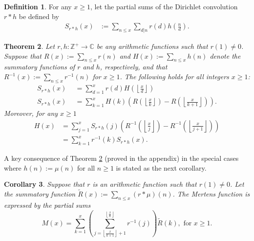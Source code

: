 \documentclass[11pt,reqno,a4letter]{article}
\newcommand{\hlocalref}[1]{\hyperref[#1]{\ref{#1}}}
\numberwithin{equation}{section}
\numberwithin{figure}{section}
\numberwithin{table}{section}
\newcommand{\floor}[1]{\left\lfloor #1 \right\rfloor}
\newcommand{\Floor}[2]{\ensuremath{\left\lfloor \frac{#1}{#2} \right\rfloor}}
\theoremstyle{plain}
\newtheorem{theorem}{Theorem}
\newtheorem{cor}[theorem]{Corollary}
\numberwithin{theorem}{section}
\theoremstyle{definition}
\newtheorem{definition}[theorem]{Definition}
\begin{document}
\begin{definition}
For any $x \geq 1$, let the partial sums of the Dirichlet convolution $r \ast h$ be defined by 
\begin{align*} 
S_{r \ast h}(x) & := \sum_{n \leq x} \sum_{d|n} r(d) h\left(\frac{n}{d}\right). 
\end{align*}
\end{definition}

\begin{theorem} 
\label{theorem_SummatoryFuncsOfDirCvls} 
Let $r,h: \mathbb{Z}^{+} \rightarrow \mathbb{C}$ be any arithmetic functions such that $r(1) \neq 0$. 
Suppose that $R(x) := \sum_{n \leq x} r(n)$ and $H(x) := \sum_{n \leq x} h(n)$ denote the summatory 
functions of $r$ and $h$, respectively, and that 
$R^{-1}(x) := \sum_{n \leq x} r^{-1}(n)$ for $x \geq 1$. 
The following holds for all integers $x \geq 1$: 
\begin{align*} 
S_{r \ast h}(x) & \phantom{:}= \sum_{d=1}^x r(d) H\left(\Floor{x}{d}\right) \\ 
S_{r \ast h}(x) & \phantom{:}= \sum_{k=1}^{x} H(k) \left(R\left(\Floor{x}{k}\right) - 
     R\left(\Floor{x}{k+1}\right)\right). 
\end{align*} 
Moreover, for any $x \geq 1$ 
\begin{align*} 
H(x) & = \sum_{j=1}^{x} S_{r \ast h}(j) \left(R^{-1}\left(\Floor{x}{j}\right) - 
     R^{-1}\left(\Floor{x}{j+1}\right)\right) \\ 
     & = \sum_{k=1}^{x} r^{-1}(k) S_{r \ast h}(x). 
\end{align*} 
\end{theorem} 

A key consequence of Theorem \hlocalref{theorem_SummatoryFuncsOfDirCvls} 
(proved in the appendix) 
in the special cases where $h(n) := \mu(n)$ for all $n \geq 1$ 
is stated as the next corollary. 

\begin{cor} 
\label{cor_CvlGAstMu} 
Suppose that $r$ is an arithmetic function such that 
$r(1) \neq 0$. Let the summatory function 
$\widetilde{R}(x) := \sum_{n \leq x} (r \ast \mu)(n)$. 
The Mertens function is expressed by the partial sums 
\[
M(x) = \sum_{k=1}^{x} \left(\sum_{j=\floor{\frac{x}{k+1}}+1}^{\floor{\frac{x}{k}}} r^{-1}(j)\right) 
     \widetilde{R}(k), \text{ for } x \geq 1. 
\]
\end{cor} 
\end{document}
